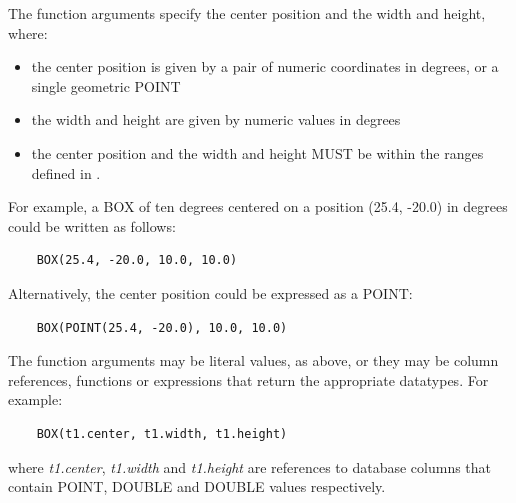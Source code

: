 \documentclass[11pt,a4paper]{ivoa}
\begin{document}


The function arguments specify the center position and the width and height,
where:
\begin{itemize}
    \item the center position is given by a pair of numeric coordinates
    in degrees, or a single geometric POINT
    \item the width and height are given by numeric values in degrees
    \item the center position and the width and height MUST be within the ranges defined in
    .
\end{itemize}

For example, a BOX of ten degrees centered on a position
(25.4, -20.0) in degrees could be written as follows:
\begin{verbatim}
    BOX(25.4, -20.0, 10.0, 10.0)
\end{verbatim}

Alternatively, the center position could be expressed as a POINT:
\begin{verbatim}
    BOX(POINT(25.4, -20.0), 10.0, 10.0)
\end{verbatim}

The function arguments may be literal values, as above, or they may be
column references, functions or expressions that return the appropriate
datatypes.
For example:
\begin{verbatim}
    BOX(t1.center, t1.width, t1.height)
\end{verbatim}
where \textit{t1.center}, \textit{t1.width} and \textit{t1.height}
are references to database columns that contain POINT, DOUBLE
and DOUBLE values respectively.
\end{document}
